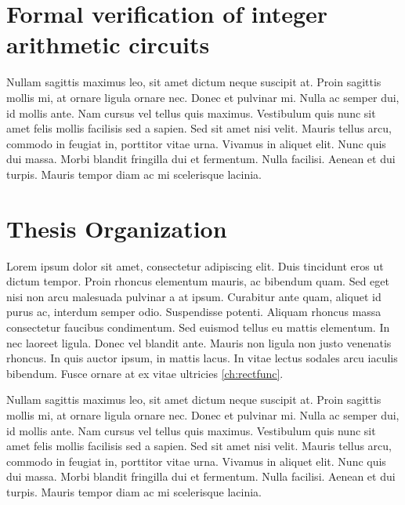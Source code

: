 \section{Formal verification of integer arithmetic circuits}

Nullam sagittis maximus leo, sit amet dictum neque suscipit at. Proin sagittis mollis mi, at ornare ligula ornare nec. Donec et pulvinar mi. Nulla ac semper dui, id mollis ante. Nam cursus vel tellus quis maximus. Vestibulum quis nunc sit amet felis mollis facilisis sed a sapien. Sed sit amet nisi velit. Mauris tellus arcu, commodo in feugiat in, porttitor vitae urna. Vivamus in aliquet elit. Nunc quis dui massa. Morbi blandit fringilla dui et fermentum. Nulla facilisi. Aenean et dui turpis. Mauris tempor diam ac mi scelerisque lacinia.

\section{Thesis Organization}
Lorem ipsum dolor sit amet, consectetur adipiscing elit. Duis tincidunt eros ut dictum tempor. Proin rhoncus elementum mauris, ac bibendum quam. Sed eget nisi non arcu malesuada pulvinar a at ipsum. Curabitur ante quam, aliquet id purus ac, interdum semper odio. Suspendisse potenti. Aliquam rhoncus massa consectetur faucibus condimentum. Sed euismod tellus eu mattis elementum. In nec laoreet ligula. Donec vel blandit ante. Mauris non ligula non justo venenatis rhoncus. In quis auctor ipsum, in mattis lacus. In vitae lectus sodales arcu iaculis bibendum. Fusce ornare at ex vitae ultricies \ref{ch:rectfunc}.

Nullam sagittis maximus leo, sit amet dictum neque suscipit at. Proin sagittis mollis mi, at ornare ligula ornare nec. Donec et pulvinar mi. Nulla ac semper dui, id mollis ante. Nam cursus vel tellus quis maximus. Vestibulum quis nunc sit amet felis mollis facilisis sed a sapien. Sed sit amet nisi velit. Mauris tellus arcu, commodo in feugiat in, porttitor vitae urna. Vivamus in aliquet elit. Nunc quis dui massa. Morbi blandit fringilla dui et fermentum. Nulla facilisi. Aenean et dui turpis. Mauris tempor diam ac mi scelerisque lacinia.
